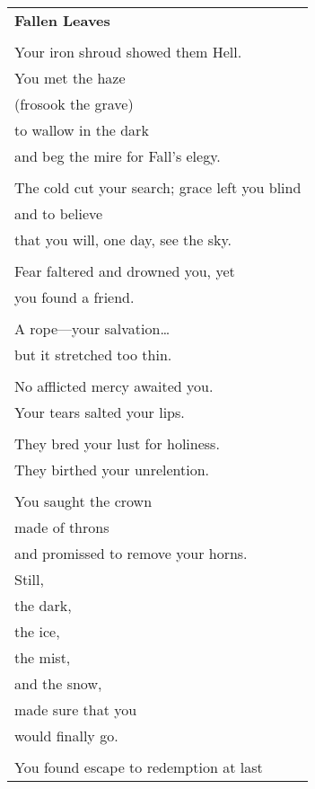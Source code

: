 \documentclass{article}
\begin{document}
\begin{center}
\begin{tabular}{l}
\textbf{Fallen Leaves} \\
\\
Your iron shroud showed them Hell. \\
You met the haze \\
(frosook the grave) \\
to wallow in the dark \\
and beg the mire for Fall's elegy. \\
\\
The cold cut your search;
grace left you blind \\
and to believe \\
that you will, one day, see the sky. \\
\\
Fear faltered and drowned you, yet \\
you found a friend. \\
\\
A rope---your salvation\ldots{} \\
but it stretched too thin. \\
\\
No afflicted mercy awaited you. \\
Your tears salted your lips. \\
\\
They bred your lust for holiness. \\
They birthed your unrelention. \\
\\
You saught the crown \\
\hspace*{2ex}made of throns \\
\hspace*{4ex}and promissed to remove your horns. \\
Still, \\
\hspace*{2ex}the dark, \\
\hspace*{4ex}the ice, \\
\hspace*{6ex}the mist, \\
\hspace*{8ex}and the snow, \\
made sure that you \\
would finally go. \\
\\
You found escape to redemption at last \\

\end{tabular}
\end{center}
\end{document}
